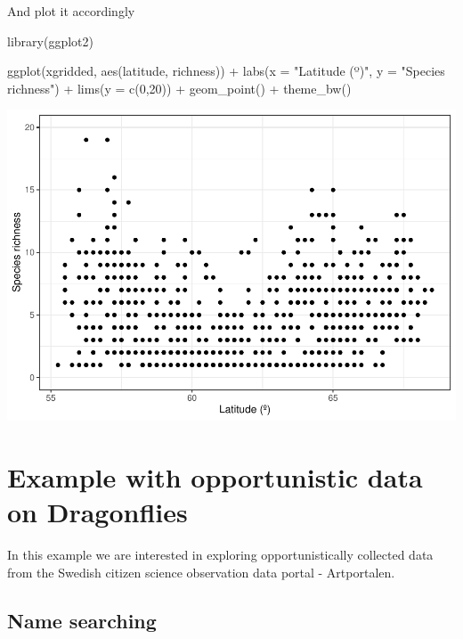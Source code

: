 \documentclass[
  10pt,
]{article}
\newenvironment{Shaded}{\begin{snugshade}}{\end{snugshade}}
\newcommand{\AttributeTok}[1]{\textcolor[rgb]{0.77,0.63,0.00}{#1}}
\newcommand{\DecValTok}[1]{\textcolor[rgb]{0.00,0.00,0.81}{#1}}
\newcommand{\FunctionTok}[1]{\textcolor[rgb]{0.00,0.00,0.00}{#1}}
\newcommand{\NormalTok}[1]{#1}
\newcommand{\SpecialCharTok}[1]{\textcolor[rgb]{0.00,0.00,0.00}{#1}}
\newcommand{\StringTok}[1]{\textcolor[rgb]{0.31,0.60,0.02}{#1}}
\begin{document}
And plot it accordingly

\begin{Shaded}
\begin{Highlighting}[]
\FunctionTok{library}\NormalTok{(ggplot2)}

\FunctionTok{ggplot}\NormalTok{(xgridded, }\FunctionTok{aes}\NormalTok{(latitude, richness)) }\SpecialCharTok{+} 
  \FunctionTok{labs}\NormalTok{(}\AttributeTok{x =} \StringTok{"Latitude (º)"}\NormalTok{, }
       \AttributeTok{y =} \StringTok{"Species richness"}\NormalTok{) }\SpecialCharTok{+}
  \FunctionTok{lims}\NormalTok{(}\AttributeTok{y =} \FunctionTok{c}\NormalTok{(}\DecValTok{0}\NormalTok{,}\DecValTok{20}\NormalTok{)) }\SpecialCharTok{+}
  \FunctionTok{geom\_point}\NormalTok{() }\SpecialCharTok{+} 
  \FunctionTok{theme\_bw}\NormalTok{()}
\end{Highlighting}
\end{Shaded}

\includegraphics{r-tools-tutorial_files/figure-latex/plot_richLat-1.pdf}

\hypertarget{example-with-opportunistic-data-on-dragonflies}{%
\section{Example with opportunistic data on Dragonflies}\label{example-with-opportunistic-data-on-dragonflies}}

In this example we are interested in exploring opportunistically collected data
from the Swedish citizen science observation data portal - Artportalen.

\hypertarget{name-searching}{%
\subsection{Name searching}\label{name-searching}}
\end{document}

